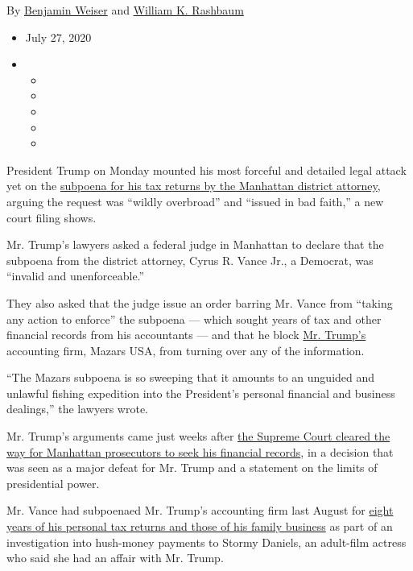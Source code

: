 By \href{https://www.nytimes.com/by/benjamin-weiser}{Benjamin Weiser}
and \href{https://www.nytimes.com/by/william-k-rashbaum}{William K.
Rashbaum}

\begin{itemize}
\item
  July 27, 2020
\item
  \begin{itemize}
  \item
  \item
  \item
  \item
  \item
  \end{itemize}
\end{itemize}

President Trump on Monday mounted his most forceful and detailed legal
attack yet on the
\href{https://www.nytimes.com/2020/08/03/nyregion/donald-trump-taxes-cyrus-vance.html}{subpoena
for his tax returns by the Manhattan district attorney}, arguing the
request was ``wildly overbroad'' and ``issued in bad faith,'' a new
court filing shows.

Mr. Trump's lawyers asked a federal judge in Manhattan to declare that
the subpoena from the district attorney, Cyrus R. Vance Jr., a Democrat,
was ``invalid and unenforceable.''

They also asked that the judge issue an order barring Mr. Vance from
``taking any action to enforce'' the subpoena --- which sought years of
tax and other financial records from his accountants --- and that he
block
\href{https://www.nytimes.com/2020/07/28/us/politics/donald-fred-trump.html}{Mr.
Trump's} accounting firm, Mazars USA, from turning over any of the
information.

``The Mazars subpoena is so sweeping that it amounts to an unguided and
unlawful fishing expedition into the President's personal financial and
business dealings,'' the lawyers wrote.

Mr. Trump's arguments came just weeks after
\href{https://www.nytimes.com/2020/07/09/us/trump-taxes-supreme-court.html?action=click\&module=RelatedLinks\&pgtype=Article}{the
Supreme Court cleared the way for Manhattan prosecutors to seek his
financial records}, in a decision that was seen as a major defeat for
Mr. Trump and a statement on the limits of presidential power.

Mr. Vance had subpoenaed Mr. Trump's accounting firm last August for
\href{https://www.nytimes.com/2019/09/16/nyregion/trump-tax-returns-cy-vance.html}{eight
years of his personal tax returns and those of his family business} as
part of an investigation into hush-money payments to Stormy Daniels, an
adult-film actress who said she had an affair with Mr. Trump.

